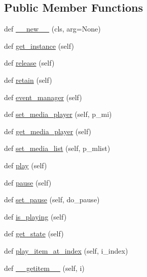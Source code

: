 \subsection*{Public Member Functions}
\begin{DoxyCompactItemize}
\item 
def \hyperlink{classvlc_1_1_media_list_player_aaff5444cab9af1af2e1471e196ef53e3}{\+\_\+\+\_\+new\+\_\+\+\_\+} (cls, arg=None)
\item 
def \hyperlink{classvlc_1_1_media_list_player_a56c15bafa43c856366863fc07fc4021f}{get\+\_\+instance} (self)
\item 
def \hyperlink{classvlc_1_1_media_list_player_a4cd51e19135e5ad4a19eae3ea9c60537}{release} (self)
\item 
def \hyperlink{classvlc_1_1_media_list_player_a6394d82a0b79f0f91bb059d20ab43490}{retain} (self)
\item 
def \hyperlink{classvlc_1_1_media_list_player_ab7c92812cd259eb8e4e4fd292b81bfaa}{event\+\_\+manager} (self)
\item 
def \hyperlink{classvlc_1_1_media_list_player_a27e9842493d76d15873d9f12d4b93440}{set\+\_\+media\+\_\+player} (self, p\+\_\+mi)
\item 
def \hyperlink{classvlc_1_1_media_list_player_a19740d569e3e3e0dd5f94695cd2a34f0}{get\+\_\+media\+\_\+player} (self)
\item 
def \hyperlink{classvlc_1_1_media_list_player_a1c53c0a0c9f96653a3c38cc54986b4e7}{set\+\_\+media\+\_\+list} (self, p\+\_\+mlist)
\item 
def \hyperlink{classvlc_1_1_media_list_player_a9942567d8012950a20b0798b4203bb57}{play} (self)
\item 
def \hyperlink{classvlc_1_1_media_list_player_aee7a4c35e3232c131ff62b5866eb4a16}{pause} (self)
\item 
def \hyperlink{classvlc_1_1_media_list_player_ab35d8dc9f1faad46ff204872a225ad49}{set\+\_\+pause} (self, do\+\_\+pause)
\item 
def \hyperlink{classvlc_1_1_media_list_player_a48c6394263dfdf45970dbd872d52c8d8}{is\+\_\+playing} (self)
\item 
def \hyperlink{classvlc_1_1_media_list_player_adf1f4fd59e6ea40d38c2b677a757007f}{get\+\_\+state} (self)
\item 
def \hyperlink{classvlc_1_1_media_list_player_a3417cb00988d93c1cfa0123e93059d19}{play\+\_\+item\+\_\+at\+\_\+index} (self, i\+\_\+index)
\item 
def \hyperlink{classvlc_1_1_media_list_player_af2c6b7930c773edecd6d320e4c263421}{\+\_\+\+\_\+getitem\+\_\+\+\_\+} (self, i)

\end{DoxyCompactItemize}
